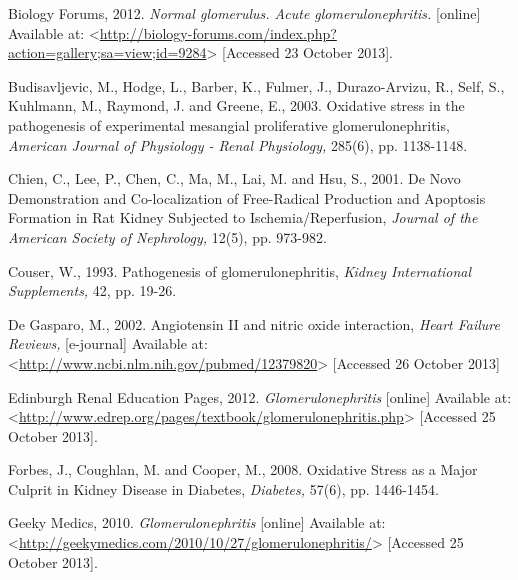 \documentclass[12pt]{report}
\begin{document}
Biology Forums, 2012. \textit{Normal glomerulus. Acute glomerulonephritis.} [online] Available at: <\url{http://biology-forums.com/index.php?action=gallery;sa=view;id=9284}> [Accessed 23 October 2013].
\newline
\newline

Budisavljevic, M., Hodge, L., Barber, K., Fulmer, J., Durazo-Arvizu, R., Self, S., Kuhlmann, M., Raymond, J. and Greene, E., 2003. Oxidative stress in the pathogenesis of experimental mesangial proliferative glomerulonephritis, \textit{American Journal of Physiology - Renal Physiology,} 285(6), pp. 1138-1148.
\newline
\newline

Chien, C., Lee, P., Chen, C., Ma, M., Lai, M. and Hsu, S., 2001. De Novo Demonstration and Co-localization of Free-Radical Production and Apoptosis Formation in Rat Kidney Subjected to Ischemia/Reperfusion, \textit{Journal of the American Society of Nephrology,} 12(5), pp. 973-982.
\newline
\newline

Couser, W., 1993. Pathogenesis of glomerulonephritis, \textit{Kidney International Supplements,} 42, pp. 19-26.
\newline
\newline

De Gasparo, M., 2002. Angiotensin II and nitric oxide interaction, \textit{Heart Failure Reviews,} [e-journal] Available at:<\url{http://www.ncbi.nlm.nih.gov/pubmed/12379820}> [Accessed 26 October 2013]
\newline
\newline

Edinburgh Renal Education Pages, 2012. \textit{Glomerulonephritis} [online] Available at: <\url{http://www.edrep.org/pages/textbook/glomerulonephritis.php}> [Accessed 25 October 2013].
\newline
\newline

Forbes, J., Coughlan, M. and Cooper, M., 2008. Oxidative Stress as a Major Culprit in Kidney Disease in Diabetes, \textit{Diabetes,} 57(6), pp. 1446-1454.
\newline
\newline

Geeky Medics, 2010. \textit{Glomerulonephritis} [online] Available at: <\url{http://geekymedics.com/2010/10/27/glomerulonephritis/}> [Accessed 25 October 2013].
\newline
\newline
\end{document}
